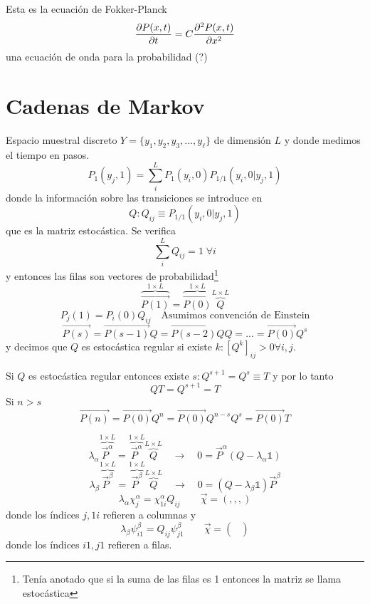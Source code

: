 \documentclass[10pt,oneside]{CBFT_book}
\begin{document}
Esta es la ecuación de Fokker-Planck
\[
	\dpar{P(x,t)}{t} = C \dpar[2]{P(x,t)}{x}
\]
una ecuación de onda para la probabilidad (?)


\section{Cadenas de Markov}

Espacio muestral discreto $Y=\{ y_1, y_2, y_3,...,y_\ell \}$ de dimensión $L$ y donde
medimos el tiempo en pasos.
\[
	P_1(y_j,1) = \sum_i^L P_1(y_i,0) P_{1/1}(y_i,0|y_j,1)
\]
donde la información sobre las transiciones se introduce en
\[
	Q : Q_{ij} \equiv P_{1/1}(y_i,0|y_j,1)
\]
que es la matriz estocástica.
Se verifica
\[
	\sum_i^L Q_{ij} = 1 \; \forall i
\]
y entonces las filas son vectores de probabilidad\footnote{Tenía anotado que si
la suma de las filas es 1 entonces la matriz se llama estocástica}
\[
	\overbrace{\vec{P(1)}}^{1\times L} =  \overbrace{\vec{P(0)}}^{1\times L} 
\overbrace{Q}^{L\times L}
\]
\[
	P_j(1) = P_i(0) Q_{ij} \quad \text{Asumimos convención de Einstein}
\]
\[
	\vec{P(s)} = \vec{P(s-1)}Q = \vec{P(s-2)} Q Q = ... = \vec{P(0)}Q^s
\] 
y decimos que $Q$ es estocástica regular si existe $k : [Q^k]_{ij} > 0 \forall i,j$.


Si $Q$ es estocástica regular entonces existe $s : Q^{s+1} = Q^s \equiv T$ y por lo tanto
\[
	Q T = Q^{s+1} = T
\]
Si $n>s$
\[
	\vec{P(n)} = \vec{P(0)} Q^n = \vec{P(0)} Q^{n-s} Q^s = \vec{P(0)} T
\]

\[
	\lambda_\alpha \overbrace{\vec{P}^\alpha}^{1\times L} =  
	\overbrace{\vec{P}^\alpha}^{1\times L} \overbrace{Q}^{L\times L}
	\quad \rightarrow \quad 0 = \vec{P}^\alpha (Q-\lambda_\alpha \mathbb{1}) 
\]
\[
	\lambda_\beta \overbrace{\vec{P}^\beta}^{1\times L} = 
	\overbrace{\vec{P}^\beta}^{1\times L} \overbrace{Q}^{L\times L}
	\quad \rightarrow \quad  0 = (Q-\lambda_\beta \mathbb{1}) \vec{P}^\beta
\]
\[
	\lambda_\alpha \chi_j^\alpha = \chi_{1i}^\alpha Q_{ij} \qquad \vec{\chi} = (,,,)
\]
donde los índices $j,1i$ refieren a columnas y
\[
	\lambda_\beta \psi_{i1}^\beta = Q_{ij} \psi_{j1}^\beta \qquad \vec{\chi} = 
\begin{pmatrix}
                                                                            \\
                                                                            \\
                                                                            
                                                                           \end{pmatrix}
\]
donde los índices $i1,j1$ refieren a filas.
\end{document}
